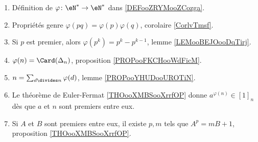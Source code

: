 		\label{THMooUDYMooCCXdbw}
\begin{enumerate}
	\item
	      Définition de \(\varphi \colon \eN^*\to \eN^*  \) dans \ref{DEFooZRYMooZCozga}.
	\item
	      Propriétés genre \( \varphi(pq)=\varphi(p)\varphi(q)\), corolaire \ref{CorlvTmsf}.
	\item
	      Si \( p\) est premier, alors \( \varphi(p^k)=p^k-p^{k-1}\), lemme \ref{LEMooBEJOooDqTirj}.
	\item
	      \( \varphi(n)=\Card(\Delta_n)\), proposition \ref{PROPooFKCHooWdFicM}.
	\item
	      \( n=\sum_{d\divides n}\varphi(d)\), lemme \ref{PROPooYHUDooUROTiN}.
	\item
	      Le théorème de Euler-Fermat \ref{THOooXMBSooXrrfOP} donne \( a^{\varphi(n)}\in[1]_n\) dès que \( a\) et \( n\) sont premiers entre eux.
	\item
	      Si \( A\) et \( B\) sont premiers entre eux, il existe \( p,m\) tels que \( A^p=mB+1\), proposition \ref{THOooXMBSooXrrfOP}.
\end{enumerate}
